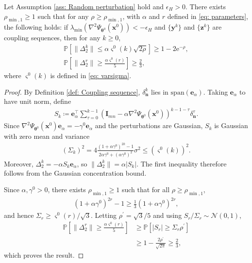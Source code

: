\documentclass{siamart251216}
\begin{document}
\begin{lemma}
    \label{lem: Dynamic concentration 1}
    Let Assumption \ref{ass: Random perturbation} hold and $\epsilon_{H}>0$. There exists $\rho_{\min,1}\geq1$ such that for any $\rho\geq\rho_{\min,1}$, with $\alpha$ and $r$ defined in \eqref{eq: parameters}, the following holds: if $\lambda_{\min}(\nabla^{2}\Psi_{\boldsymbol{\theta}^{0}}(\mathbf{x}^{0}))<-\epsilon_{H}$ and $\{\mathbf{y}^{k}\}$ and $\{\mathbf{z}^{k}\}$ are coupling sequences, then for any $k\geq0$,
    \begin{gather*}
        \mathbb{P}\left[\|\Delta_{2}^{k}\|\leq\alpha\varsigma^{0}(k)\sqrt{2\rho}\right]\geq1-2\mathrm{e}^{-\rho},\\
        \mathbb{P}\left[\|\Delta_{2}^{r}\|\geq\frac{\alpha\varsigma^{0}(r)}{5}\right]\geq\frac{2}{3},
    \end{gather*}
    where $\varsigma^{0}(k)$ is defined in \eqref{eq: varsigma}.
\end{lemma}

\begin{proof}
    By Definition \ref{def: Coupling sequence}, $\delta_{\mathbf{n}}^{k}$ lies in $\mathrm{span}(\mathbf{e}_{\alpha})$. Taking $\mathbf{e}_{\alpha}$ to have unit norm, define
    \begin{gather}
        \label{eq: Sum of dev}
        S_{k}\coloneqq\mathbf{e}_{\alpha}^{\top}\sum_{\tau=0}^{k-1}\left(\mathbf{I}_{mn}-\alpha\nabla^{2}\Psi_{\boldsymbol{\theta}^{0}}(\mathbf{x}^{0})\right)^{k-1-\tau}\delta_{\mathbf{n}}^{\tau}.
    \end{gather}
    Since $\nabla^{2}\Psi_{\boldsymbol{\theta}^{0}}(\mathbf{x}^{0})\mathbf{e}_{\alpha}=-\gamma^{0}\mathbf{e}_{\alpha}$ and the perturbations are Gaussian, $S_{k}$ is Gaussian with zero mean and variance
    \begin{gather*}
        (\Sigma_{k})^{2}=4\frac{(1+\alpha\gamma^{0})^{2k}-1}{2\alpha\gamma^{0}+(\alpha\gamma^{0})^{2}}\sigma^{2}\leq(\varsigma^{0}(k))^{2}.
    \end{gather*}
    Moreover, $\Delta_{2}^{k}=-\alpha S_{k}\mathbf{e}_{\alpha}$, so $\|\Delta_{2}^{k}\|=\alpha|S_{k}|$. The first inequality therefore follows from the Gaussian concentration bound.

    Since $\alpha,\gamma^{0}>0$, there exists $\rho_{\min,1}\geq1$ such that for all $\rho\geq\rho_{\min,1}$,
    \begin{gather*}
        (1+\alpha\gamma^{0})^{2r}-1\geq\frac{1}{3}(1+\alpha\gamma^{0})^{2r},
    \end{gather*}
    and hence $\Sigma_{r}\geq\varsigma^{0}(r)/\sqrt{3}$. Letting $\rho^{\prime}=\sqrt{3}/5$ and using $S_{r}/\Sigma_{r}\sim\mathcal{N}(0,1)$,
    \begin{align*}
        \mathbb{P}\left[\|\Delta_{2}^{r}\|\geq\frac{\alpha\varsigma^{0}(r)}{5}\right]
        &\geq\mathbb{P}\left[|S_{r}|\geq\Sigma_{r}\rho^{\prime}\right]\\
        &\geq1-\frac{2\rho^{\prime}}{\sqrt{2\pi}}
        \geq\frac{2}{3},
    \end{align*}
    which proves the result.
\end{proof}
\end{document}
